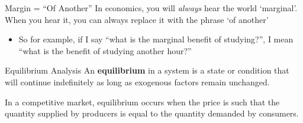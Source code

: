 \documentclass{beamer}
\begin{document}
\begin{frame}{Margin = ``Of Another''}
  In economics, you will \emph{always} hear the world `marginal'. When you hear it, you can always replace it with the phrase `of another'

  \begin{itemize}
    \item So for example, if I say ``what is the marginal benefit of studying?'', I mean ``what is the benefit of studying another hour?''
  \end{itemize}
\end{frame}

\begin{frame}{Equilibrium Analysis}
  An \textbf{equilibrium} in a system is a state or condition that will continue indefinitely as long as exogenous factors remain unchanged.

  \bigskip
  In a competitive market, equilibrium occurs when the price is such that the quantity supplied by producers is equal to the quantity demanded by consumers.
\end{frame}
\end{document}
